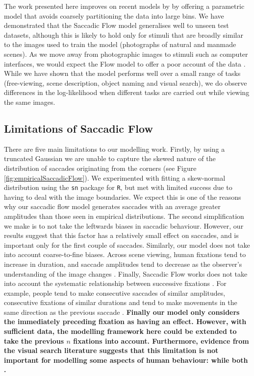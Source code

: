 \documentclass[a4paper, twocolumn, oneside, 11pt]{article}
\begin{document}
The work presented here improves on recent models by \cite{clarke2016,leMeur-coutrot2016} by offering a parametric model that avoids coarsely partitioning the data into large bins. We have demonstrated that the Saccadic Flow model generalises well to unseen test datasets, although this is likely to hold only for stimuli that are broadly similar to the images used to train the model (photographs of natural and manmade scenes). As we move away from photographic images to stimuli such as computer interfaces, we would expect the Flow model to offer a poor account of the data \citep{leMeur-coutrot2016}. While we have shown that the model performs well over a small range of tasks (free-viewing, scene description, object naming and visual search), we do observe differences in the log-likelihood when different tasks are carried out while viewing the same images. 

\subsection{Limitations of Saccadic Flow}

There are five main limitations to our modelling work. Firstly, by using a truncated Gaussian we are unable to capture the skewed nature of the distribution of saccades originating from the corners (see Figure  \ref{fig:empiricalSaccadicFlow}). We experimented with fitting a skew-normal distribution using the \texttt{sn} package for \texttt{R}, but met with limited success due to having to deal with the image boundaries. We expect this is one of the reasons why our saccadic flow model generates saccades with an average greater amplitudes than those seen in empirical distributions.  The second simplification we make is to not take the leftwards biases in saccadic behaviour. However, our results suggest that this factor has a relatively small effect on saccades, and is important only for the first couple of saccades. Similarly, our model does not take into account coarse-to-fine biases. Across scene viewing, human fixations tend to increase in duration, and saccade amplitudes tend to decrease as the observer's understanding of the image changes \citep{antes1974}. Finally, Saccadic Flow works does not take into account the systematic relationship between successive fixations \citep{tatler2008}. For example, people tend to make consecutive saccades of similar amplitudes, consecutive fixations of similar durations and tend to make movements in the same direction as the previous saccade \citep{macinnes2014}. \textbf{Finally our model only considers the immediately preceding fixation as having an effect. However, with sufficient data, the modelling framework here could be extended to take the previous $n$ fixations into account. Furthermore, evidence from the visual search literature suggests that this limitation is not important for modelling some aspects of human behaviour:  while both \cite{clarke2016}.}
\end{document}

